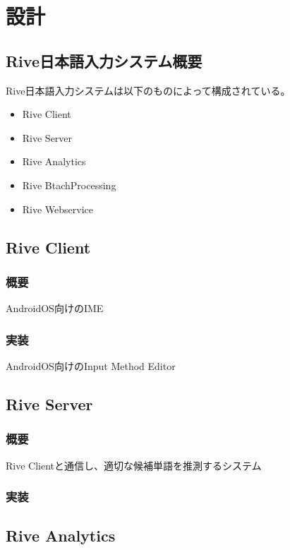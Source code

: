 \chapter{設計}
\label{chap:design}

\section{Rive日本語入力システム概要}

Rive日本語入力システムは以下のものによって構成されている。

\begin{itemize}
  \item Rive Client
  \item Rive Server
  \item Rive Analytics
  \item Rive BtachProcessing
  \item Rive Webservice
\end{itemize}


\section{Rive Client}
\subsection{概要}
AndroidOS向けのIME
\subsection{実装}
AndroidOS向けのInput Method Editor

\section{Rive Server}
\subsection{概要}
Rive Clientと通信し、適切な候補単語を推測するシステム
\subsection{実装}

\section{Rive Analytics}

